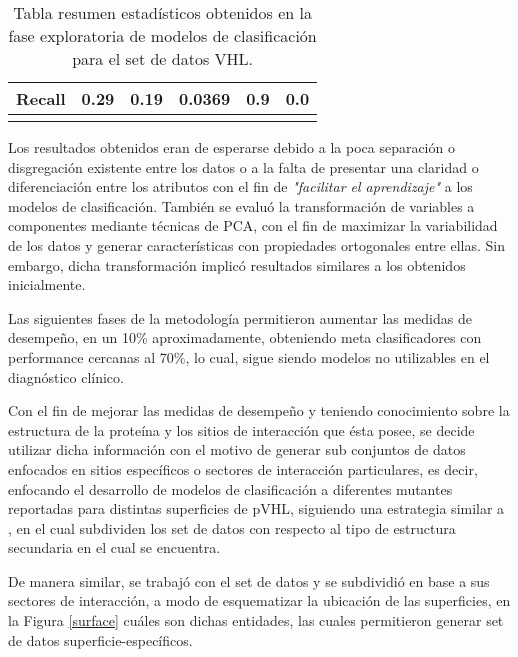 \begin{longtable}[c]{|l|l|l|l|l|l|}
	\textbf{Recall}                        & 0.29                                  & 0.19                                                                                      & 0.0369                                 & 0.9                                                                               & 0.0                                                                               \\ \hline
	\caption{Tabla resumen estadísticos obtenidos en la fase exploratoria de modelos de clasificación para el set de datos VHL.}
	\label{tab:summaryStatistic}\\
\end{longtable}

Los resultados obtenidos eran de esperarse debido a la poca separación o disgregación existente entre los datos o a la falta de presentar una claridad o diferenciación entre los atributos con el fin de \textit{"facilitar el aprendizaje"} a los modelos de clasificación. También se evaluó la transformación de variables a componentes mediante técnicas de PCA, con el fin de maximizar la variabilidad de los datos y generar características con propiedades ortogonales entre ellas. Sin embargo, dicha transformación implicó resultados similares a los obtenidos inicialmente. 

Las siguientes fases de la metodología permitieron aumentar las medidas de desempeño, en un 10\% aproximadamente, obteniendo meta clasificadores con performance cercanas al 70\%, lo cual, sigue siendo modelos no utilizables en el diagnóstico clínico. 

Con el fin de mejorar las medidas de desempeño y teniendo conocimiento sobre la estructura de la proteína y los sitios de interacción que ésta posee, se decide utilizar dicha información con el motivo de generar sub conjuntos de datos enfocados en sitios específicos o sectores de interacción particulares, es decir, enfocando el desarrollo de modelos de clasificación a diferentes mutantes reportadas para distintas superficies de pVHL, siguiendo una estrategia similar a \cite{Capriotti2005}, en el cual subdividen los set de datos con respecto al tipo de estructura secundaria en el cual se encuentra.

De manera similar, se trabajó con el set de datos y se subdividió en base a sus sectores de interacción, a modo de esquematizar la ubicación de las superficies, en la Figura \ref{surface} cuáles son dichas entidades, las cuales permitieron generar set de datos superficie-específicos.

